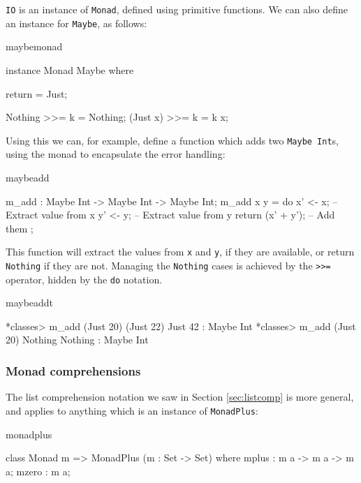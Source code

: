 \noindent
\texttt{IO} is an instance of \texttt{Monad}, defined using primitive functions.
We can also define an instance for \texttt{Maybe}, as follows:

\begin{SaveVerbatim}{maybemonad}

instance Monad Maybe where {
    return = Just;

    Nothing  >>= k = Nothing;
    (Just x) >>= k = k x;
}

\end{SaveVerbatim}

\noindent
Using this we can, for example, define a function which adds two 
\texttt{Maybe Int}s, using the monad to encapsulate the error handling:

\begin{SaveVerbatim}{maybeadd}

m_add : Maybe Int -> Maybe Int -> Maybe Int;
m_add x y = do { x' <- x; -- Extract value from x
                 y' <- y; -- Extract value from y
                 return (x' + y'); -- Add them 
               };

\end{SaveVerbatim}

\noindent
This function will extract the values from \texttt{x} and \texttt{y}, if they
are available, or return \texttt{Nothing} if they are not. Managing the
\texttt{Nothing} cases is achieved by the \texttt{>>=} operator, hidden by the
\texttt{do} notation.

\begin{SaveVerbatim}{maybeaddt}

*classes> m_add (Just 20) (Just 22) 
Just 42 : Maybe Int
*classes> m_add (Just 20) Nothing 
Nothing : Maybe Int

\end{SaveVerbatim}

\subsubsection*{Monad comprehensions}

The list comprehension notation we saw in Section \ref{sec:listcomp} is more
general, and applies to anything which is an instance of \texttt{MonadPlus}:

\begin{SaveVerbatim}{monadplus}

class Monad m => MonadPlus (m : Set -> Set) where {
    mplus : m a -> m a -> m a;
    mzero : m a;
}

\end{SaveVerbatim}

